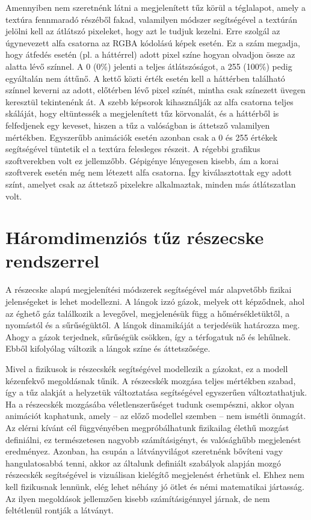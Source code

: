 Amennyiben nem szeretnénk látni a megjelenített tűz körül a téglalapot, amely a textúra fennmaradó részéből fakad, valamilyen módszer segítségével a textúrán jelölni kell az átlátszó pixeleket, hogy azt le tudjuk kezelni. Erre szolgál az úgynevezett alfa csatorna az RGBA kódolású képek esetén. Ez a szám megadja, hogy átfedés esetén (pl. a háttérrel) adott pixel színe hogyan olvadjon össze az alatta lévő színnel.  A 0 (0\%) jelenti a teljes átlátszóságot, a 255 (100\%) pedig egyáltalán nem áttűnő. A kettő közti érték esetén kell a háttérben található színnel keverni az adott, előtérben lévő pixel színét, mintha csak színezett üvegen keresztül tekintenénk át. A szebb képsorok kihasználják az alfa csatorna teljes skáláját, hogy eltüntessék a megjelenített tűz körvonalát, és a háttérből is felfedjenek egy keveset, hiszen a tűz a valóságban is áttetsző valamilyen mértékben. Egyszerűbb animációk esetén azonban csak a 0 és 255 értékek segítségével tüntetik el a textúra felesleges részeit. A régebbi grafikus szoftverekben volt ez jellemzőbb. Gépigénye lényegesen kisebb, ám a korai szoftverek esetén még nem létezett alfa csatorna. Így kiválasztottak egy adott színt, amelyet csak az áttetsző pixelekre alkalmaztak, minden más átlátszatlan volt.








\section{Háromdimenziós tűz részecske rendszerrel}

A részecske alapú megjelenítési módszerek segítségével már alapvetőbb fizikai jelenségeket is lehet modellezni. A lángok izzó gázok, melyek ott képződnek, ahol az éghető gáz találkozik a levegővel, megjelenésük függ a hőmérsékletüktől, a nyomástól és a sűrűségüktől. A lángok dinamikáját a terjedésük határozza meg. Ahogy a gázok terjednek, sűrűségük csökken, így a térfogatuk nő és lehűlnek. Ebből kifolyólag változik a lángok színe és áttetszősége. 

Mivel a fizikusok is részecskék segítségével modellezik a gázokat, ez a modell kézenfekvő megoldásnak tűnik. A részecskék mozgása teljes mértékben szabad, így a tűz alakját a helyzetük változtatása segítségével egyszerűen változtathatjuk. Ha a részecskék mozgásába véletlenszerűséget tudunk csempészni, akkor olyan animációt kaphatunk, amely -- az előző modellel szemben --  nem ismétli önmagát. Az elérni kívánt cél függvényében megpróbálhatunk fizikailag élethű mozgást definiálni, ez természetesen nagyobb számításigényt, és valósághűbb megjelenést eredményez. Azonban, ha csupán a látványvilágot szeretnénk bővíteni vagy hangulatosabbá tenni, akkor az általunk definiált szabályok alapján mozgó részecskék segítségével is vizuálisan kielégítő megjelenést érhetünk el. Ehhez nem kell fizikusnak lennünk, elég lehet néhány jó ötlet és némi matematikai jártasság. Az ilyen megoldások jellemzően kisebb számításigénnyel járnak, de nem feltétlenül rontják a látványt. 


